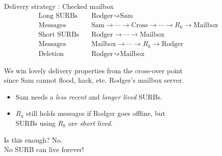 \begin{frame}[t]{Delivery strategy : Checked mailbox}
\[ \begin{aligned}
\textrm{Long SURBs}\quad & \textrm{Rodger} \rightsquigarrow \textrm{Sam} \\
\textrm{Messages}\quad & \textrm{Sam} \to \cdots \to \textrm{Cross}
  \to \cdots \to R_k \to \textrm{Mailbox} \\
\textrm{Short SURBs}\quad & \textrm{Rodger} \to \cdots \to \textrm{Mailbox} \\
\textrm{Messages}\quad & \textrm{Mailbox} \to \cdots \to R_k \to \textrm{Rodger} \\
\textrm{Deletion}\quad & \textrm{Rodger} \rightsquigarrow \textrm{Mailbox} 
\end{aligned} \]

\smallskip

We win lovely delivery properties from the cross-over point \\
 \hspace*{2pt} since Sam cannot flood, hack, etc. Rodger's mailbox server.

\smallskip

\begin{itemize}
\item Sam needs a {\em less recent} and {\em longer lived} SURBs. %
\item $R_k$ still holds messages if Rodger goes offline, but \\
 \hspace*{2pt} SURBs using $R_k$ are {\em short lived}. %
\end{itemize}


\medskip
Is this enough?  No.  \\
 \hspace*{2pt} No SURB can live forever!

\end{frame}


